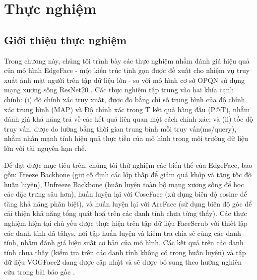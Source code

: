 \chapter{Thực nghiệm}
\label{Chapter 4}

\section {Giới thiệu thực nghiệm}



Trong chương này, chúng tôi trình bày các thực nghiệm nhằm đánh giá hiệu quả của mô hình EdgeFace - một kiến trúc tinh gọn được đề xuất cho nhiệm vụ truy xuất ảnh mặt người trên tập dữ liệu lớn - so với mô hình cơ sở OPQN sử dụng mạng xương sống ResNet20 \cite{opqn}. Các thực nghiệm tập trung vào hai khía cạnh chính: (i) độ chính xác truy xuất, được đo bằng chỉ số trung bình của độ chính xác trung bình (MAP) và Độ chính xác trong T kết quả hàng đầu (P@T), nhằm đánh giá khả năng trả về các kết quả liên quan một cách chính xác; và (ii) tốc độ truy vấn, được đo lường bằng thời gian trung bình mỗi truy vấn(ms/query), nhằm nhấn mạnh tính hiệu quả thực tiễn của mô hình trong môi trường dữ liệu lớn với tài nguyên hạn chế. 

Để đạt được mục tiêu trên, chúng tôi thử nghiệm các biến thể của EdgeFace, bao gồn: Freeze Backbone (giữ cố định các lớp thấp để giảm quá khớp và tăng tốc độ huấn luyện), Unfreeze Backbone (huấn luyện toàn bộ mạng xương sống để học các đặc trưng sâu hơn), huấn luyện lại với CoseFace (xử dụng biên độ cosine để tăng khả năng phân biệt), và huấn luyện lại với ArcFace (sử dụng biên độ góc để cải thiện khả năng tổng quát hoá trên các danh tính chưa từng thấy). Các thực nghiệm hiện tại chủ yếu được thực hiện trên tập dữ liệu FaceScrub với thiết lập các danh tính đã tâhys, nơi tập huấn luyện và kiểm tra chia sẻ cùng các danh tính, nhằm đánh giá hiệu suất cơ bản của mô hình. Các kết quả trên các danh tính chưa thấy (kiểm tra trên các danh tính không có trong huấn luyện) và tập dữ liệu VGGFace2 đang được cập nhật và sẽ được bổ sung theo hướng nghiên cứu trong bài báo gốc \cite{opqn}.

